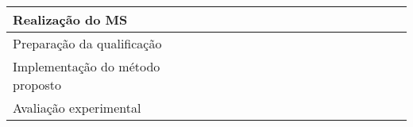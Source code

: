 \begin{table}[!ht]
\begin{tabular}{|l|l|l|l|l|l|l|l|l|l|l|l|l|l|l|l|}
	\hline
	Realização do MS                         &                                       &                                       &                                       & {\cellcolor[rgb]{0.396,0.396,0.396}}  & {\cellcolor[rgb]{0.396,0.396,0.396}}  & {\cellcolor[rgb]{0.396,0.396,0.396}}  & {\cellcolor[rgb]{0.396,0.396,0.396}}  & {\cellcolor[rgb]{0.396,0.396,0.396}}  &                                       &                                       &                                       &                                       &                                       &                                       &                                         \\ 
	\hline
	Preparação da qualificação               &                                       &                                       &                                       &                                       &                                       & {\cellcolor[rgb]{0.396,0.396,0.396}}  & {\cellcolor[rgb]{0.396,0.396,0.396}}  & {\cellcolor[rgb]{0.396,0.396,0.396}}  &                                       &                                       &                                       &                                       &                                       &                                       &                                         \\ 
	\hline
	Implementação do método proposto         &                                       &                                       &                                       &                                       &                                       &                                       &                                       &                                       & {\cellcolor[rgb]{0.396,0.396,0.396}}  & {\cellcolor[rgb]{0.396,0.396,0.396}}  & {\cellcolor[rgb]{0.396,0.396,0.396}}  &                                       &                                       &                                       &                                         \\ 
	\hline
	Avaliação experimental                   &                                       &                                       &                                       &                                       &                                       &                                       &                                       &                                       &                                       &                                       & {\cellcolor[rgb]{0.396,0.396,0.396}}  & {\cellcolor[rgb]{0.396,0.396,0.396}}  & {\cellcolor[rgb]{0.396,0.396,0.396}}  &                                       &                                         \\ 

\end{tabular}
\end{table}
